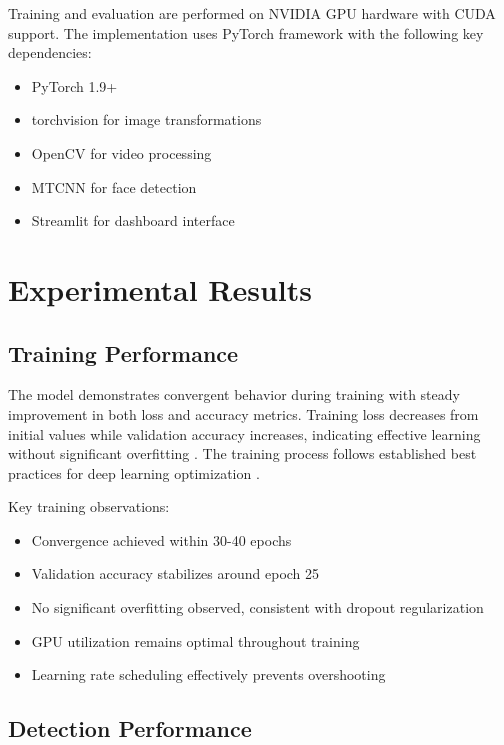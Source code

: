 \documentclass[conference]{IEEEtran}
\begin{document}
Training and evaluation are performed on NVIDIA GPU hardware with CUDA support. The implementation uses PyTorch framework with the following key dependencies:
\begin{itemize}
\item PyTorch 1.9+
\item torchvision for image transformations
\item OpenCV for video processing
\item MTCNN for face detection
\item Streamlit for dashboard interface
\end{itemize}

\section{Experimental Results}

\subsection{Training Performance}

The model demonstrates convergent behavior during training with steady improvement in both loss and accuracy metrics. Training loss decreases from initial values while validation accuracy increases, indicating effective learning without significant overfitting \cite{goodfellow2016deep}. The training process follows established best practices for deep learning optimization \cite{bengio2012practical}.

Key training observations:
\begin{itemize}
\item Convergence achieved within 30-40 epochs
\item Validation accuracy stabilizes around epoch 25
\item No significant overfitting observed, consistent with dropout regularization \cite{srivastava2014dropout}
\item GPU utilization remains optimal throughout training
\item Learning rate scheduling effectively prevents overshooting \cite{smith2017cyclical}
\end{itemize}

\subsection{Detection Performance}
\end{document}
